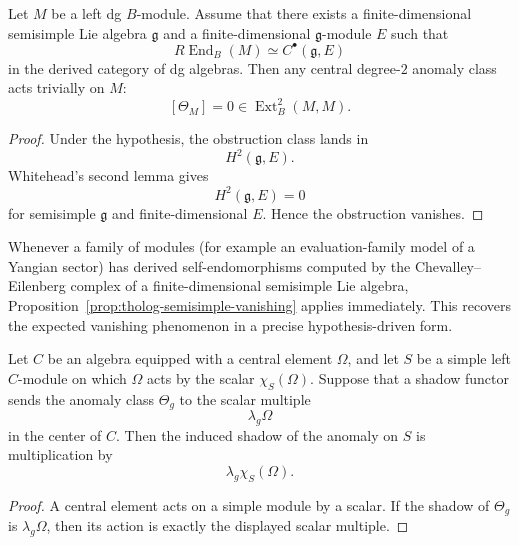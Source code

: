 \begin{proposition}
Let \(M\) be a left dg \(B\)-module.
Assume that there exists a finite-dimensional semisimple Lie algebra \(\mathfrak{g}\) and a finite-dimensional \(\mathfrak{g}\)-module \(E\) such that
\[
R\!\operatorname{End}_{B}(M)\simeq C^{\bullet}(\mathfrak{g},E)
\]
in the derived category of dg algebras.
Then any central degree-\(2\) anomaly class acts trivially on \(M\):
\[
[\Theta_{M}]=0\in \operatorname{Ext}^{2}_{B}(M,M).
\]
\end{proposition}

\begin{proof}
Under the hypothesis, the obstruction class lands in
\[
H^{2}(\mathfrak{g},E).
\]
Whitehead's second lemma gives
\[
H^{2}(\mathfrak{g},E)=0
\]
for semisimple \(\mathfrak{g}\) and finite-dimensional \(E\).
Hence the obstruction vanishes.
\end{proof}

\begin{remark}
Whenever a family of modules (for example an evaluation-family model of a Yangian sector) has derived self-endomorphisms computed by the Chevalley--Eilenberg complex of a finite-dimensional semisimple Lie algebra, Proposition~\ref{prop:tholog-semisimple-vanishing} applies immediately.
This recovers the expected vanishing phenomenon in a precise hypothesis-driven form.
\end{remark}

\begin{proposition}
Let \(C\) be an algebra equipped with a central element \(\Omega\), and let \(S\) be a simple left \(C\)-module on which \(\Omega\) acts by the scalar \(\chi_{S}(\Omega)\).
Suppose that a shadow functor sends the anomaly class \(\Theta_{g}\) to the scalar multiple
\[
\lambda_{g}\Omega
\]
in the center of \(C\).
Then the induced shadow of the anomaly on \(S\) is multiplication by
\[
\lambda_{g}\chi_{S}(\Omega).
\]
\end{proposition}

\begin{proof}
A central element acts on a simple module by a scalar.
If the shadow of \(\Theta_{g}\) is \(\lambda_{g}\Omega\), then its action is exactly the displayed scalar multiple.
\end{proof}

